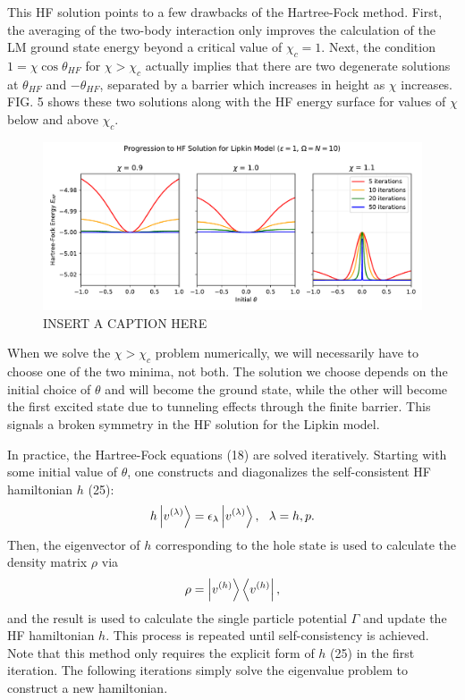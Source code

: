 \documentclass[prb,aps,twocolumn,showpacs,10pt]{revtex4-2}
\begin{document}
This HF solution points to a few drawbacks of the Hartree-Fock method. First, the averaging of the two-body interaction only improves the calculation of the LM ground state energy beyond a critical value of $\chi_c = 1$.  Next, the condition $1=\chi \cos \theta_{HF}$ for $\chi > \chi_c$ actually implies that there are two degenerate solutions at $\theta_{HF}$ and $-\theta_{HF}$, separated by a barrier which increases in height as $\chi$ increases. FIG. 5 shows these two solutions along with the HF energy surface for values of $\chi$ below and above $\chi_c$. 


\begin{figure}
  \includegraphics[width=\textwidth]{../figures/plot_hf_iter.pdf}
  \caption{INSERT A CAPTION HERE}
\end{figure}

When we solve the $\chi>\chi_c$ problem numerically, we will necessarily have to choose one of the two minima, not both. The solution we choose depends on the initial choice of $\theta$ and will become the ground state, while the other will become the first excited state due to tunneling effects through the finite barrier. This signals a broken symmetry in the HF solution for the Lipkin model.

In practice, the Hartree-Fock equations (18) are solved iteratively. Starting with some initial value of $\theta$, one constructs and diagonalizes the self-consistent HF hamiltonian $h$ (25):
\begin{equation}
h \ket{v^{(\lambda)}} = \epsilon_{\lambda} \ket{v^{(\lambda)}} , \ \ \lambda = h, p. 
\end{equation}
Then, the eigenvector of $h$ corresponding to the hole state is used to calculate the density matrix $\rho$ via
\begin{equation}
\rho = \ket{v^{(h)}} \bra{v^{(h)}},
\end{equation}
and the result is used to calculate the single particle potential $\Gamma$ and update the HF hamiltonian $h$. This process is repeated until self-consistency is achieved. Note that this method only requires the explicit form of $h$ (25) in the first iteration. The following iterations simply solve the eigenvalue problem to construct a new hamiltonian. 
\end{document}
